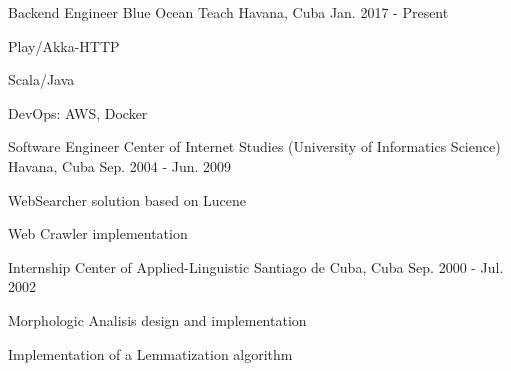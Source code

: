 


\begin{cventries}


\cventry
{Backend Engineer} %
{Blue Ocean Teach} %
{Havana, Cuba} %
{Jan. 2017 - Present} %
{ %
\begin{cvitems}
\item {Play/Akka-HTTP}
\item {Scala/Java}
\item {DevOps: AWS, Docker}
\end{cvitems}
}





\cventry
{Software Engineer} %
{Center of Internet Studies (University of Informatics Science)} %
{Havana, Cuba} %
{Sep. 2004 - Jun. 2009} %
{ %
\begin{cvitems}
\item {WebSearcher solution based on Lucene}
\item {Web Crawler implementation}
\end{cvitems}
}


\cventry
{Internship} %
{Center of Applied-Linguistic} %
{Santiago de Cuba, Cuba} %
{Sep. 2000 - Jul. 2002} %
{ %
\begin{cvitems}
\item {Morphologic Analisis design and implementation}
\item {Implementation of a Lemmatization algorithm}
\end{cvitems}
}


\end{cventries}
